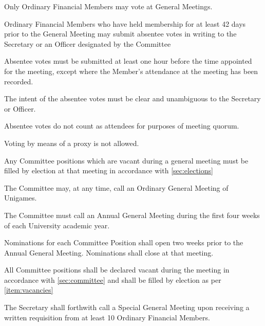 \documentclass[a4paper]{article}
\begin{document}
\begin{myEnumerate}
    \item Only Ordinary Financial Members may vote at General Meetings.
        \begin{myEnumerate}
            \item Ordinary Financial Members who have held membership for at least 42 days prior to the General Meeting may submit absentee votes in writing to the Secretary or an Officer designated by the Committee
                \begin{myEnumerate}
                    \item Absentee votes must be submitted at least one hour before the time appointed for the meeting, except where the Member’s attendance at the meeting has been recorded.
                    \item The intent of the absentee votes must be clear and unambiguous to the Secretary or Officer.
                \end{myEnumerate}
            \item Absentee votes do not count as attendees for purposes of meeting quorum.
            \item Voting by means of a proxy is not allowed.
        \end{myEnumerate}
    \item \label{item:vacancies} Any Committee positions which are vacant during a general meeting must be filled by election at that meeting in accordance with \cref{sec:elections}
    \item The Committee may, at any time, call an Ordinary General Meeting of Unigames.
    \item The Committee must call an Annual General Meeting during the first four weeks of each University academic year.
        \begin{myEnumerate}
            \item Nominations for each Committee Position shall open two weeks prior to the Annual General Meeting. Nominations shall close at that meeting.
            \item All Committee positions shall be declared vacant during the meeting in accordance with \cref{sec:committee} and shall be filled by election as per \cref{item:vacancies}
        \end{myEnumerate}
    \item The Secretary shall forthwith call a Special General Meeting upon receiving a written requisition from at least 10 Ordinary Financial Members.
        \begin{myEnumerate}

\end{myEnumerate}
\end{myEnumerate}
\end{document}
